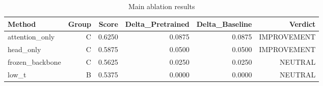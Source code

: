 \begin{table}[htbp]
\centering
\caption{Main ablation results}
\label{tab:main-results}
\begin{tabular}{lrrrrr}
\toprule
\textbf{Method} & \textbf{Group} & \textbf{Score} & \textbf{Delta\_Pretrained} & \textbf{Delta\_Baseline} & \textbf{Verdict} \\
\midrule
attention\_only & C & 0.6250 & 0.0875 & 0.0875 & IMPROVEMENT \\
head\_only & C & 0.5875 & 0.0500 & 0.0500 & IMPROVEMENT \\
frozen\_backbone & C & 0.5625 & 0.0250 & 0.0250 & NEUTRAL \\
low\_t & B & 0.5375 & 0.0000 & 0.0000 & NEUTRAL \\
\bottomrule
\end{tabular}
\end{table}